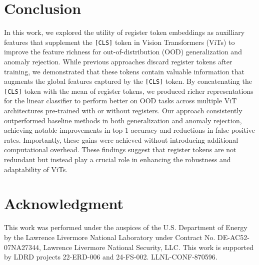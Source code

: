 \documentclass[conference]{IEEEtran}
\begin{document}
%
 \section{Conclusion}
In this work, we explored the utility of register token embeddings as auxilliary features that supplement the \texttt{[CLS]} token in Vision Transformers (ViTs) to improve the feature richness for out-of-distribution (OOD) generalization and anomaly rejection. While previous approaches discard register tokens after training, we demonstrated that these tokens contain valuable information that augments the global features captured by the \texttt{[CLS]} token. By concatenating the \texttt{[CLS]} token with the mean of register tokens, we produced richer representations for the linear classifier to perform better on OOD tasks across multiple ViT architectures pre-trained with or without registers. Our approach consistently outperformed baseline methods in both generalization and anomaly rejection, achieving notable improvements in top-1 accuracy and reductions in false positive rates. Importantly, these gains were achieved without introducing additional computational overhead. These findings suggest that register tokens are not redundant but instead play a crucial role in enhancing the robustness and adaptability of ViTs. 
 \section*{Acknowledgment}
This work was performed under the auspices of the U.S. Department of Energy by the Lawrence Livermore National Laboratory under Contract No. DE-AC52-07NA27344, Lawrence Livermore National Security, LLC. This work is supported by LDRD projects 22-ERD-006 and 24-FS-002. LLNL-CONF-870596.
\end{document}

